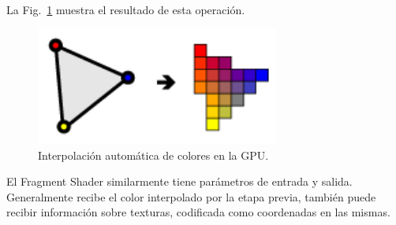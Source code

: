 La Fig.~\ref{fg:interpolation} muestra el resultado de esta operación.

\begin{figure}[h]
\begin{center}
\includegraphics[width=8cm]{figures/interpolation}
\caption{Interpolación automática de colores en la GPU.}
\end{center}
\label{fg:interpolation}
\end{figure}






El Fragment Shader similarmente tiene par\'ametros de entrada y salida. Generalmente recibe el color interpolado por la etapa previa, tambi\'en puede recibir informaci\'on sobre texturas, codificada como coordenadas en las mismas. 



